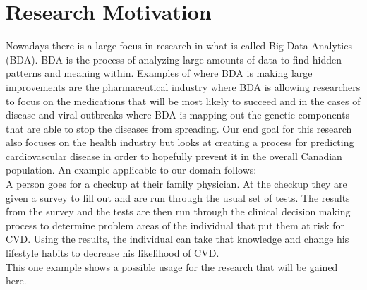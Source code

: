 \documentclass[conference]{IEEEtran}
\begin{document}
\section{Research Motivation}
Nowadays there is a large focus in research in what is called Big Data Analytics (BDA). BDA is the process of analyzing large amounts of data to find hidden patterns and meaning within. Examples of where BDA is making large improvements are the pharmaceutical industry where BDA is allowing researchers to focus on the medications that will be most likely to succeed and in the cases of disease and viral outbreaks where BDA is mapping out the genetic components that are able to stop the diseases from spreading. Our end goal for this research also focuses on the health industry but looks at creating a process for predicting cardiovascular disease in order to hopefully prevent it in the overall Canadian population. An example applicable to our domain follows:
\\
\indent A person goes for a checkup at their family physician. At the checkup they are given a survey to fill out and are run through the usual set of tests. The results from the survey and the tests are then run through the clinical decision making process to determine problem areas of the individual that put them at risk for CVD. Using the results, the individual can take that knowledge and change his lifestyle habits to decrease his likelihood of CVD.
\\
\indent This one example shows a possible usage for the research that will be gained here.
\end{document}
